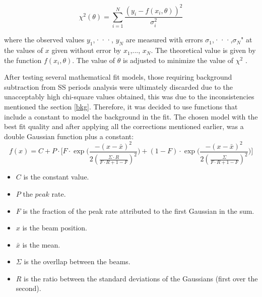 \begin{equation}
\chi^{2}(\theta)=\sum_{i=1}^{N} \frac{(y_{i}-f(x_{i},\theta))^{2}}{\sigma_{i}^{2}}
\label{x^2}
\end{equation}

where the observed values $y_{1}$,···, $y_{N}$ are measured with errors $\sigma_{1}$,···,$\sigma_{N}$" at the values of $x$ given without error by $x_{1}$,..., $x_{N}$. The theoretical  value is given by the function $f(x_{i},\theta)$. The value of $\theta$ is adjusted to minimize the value of $\chi^2$ \cite{Statistical_Data_Analysis}.

After testing several mathematical fit models, those requiring background subtraction from SS periods analysis were ultimately discarded due to the unacceptably high chi-square values obtained, this was due to the inconsistencies mentioned the section \ref{bkg}. Therefore, it was decided to use functions that include a constant to model the background in the fit. The chosen model with the best fit quality and after applying all the corrections mentioned earlier, was a double Gaussian function plus a constant:
\begin{equation}
f(x)= C+P \cdot \Biggl[ F \cdot \exp \Biggl( \frac{-(x-\bar{x})^{2}}{2(\frac{\Sigma\cdot R}{F \cdot R+1-F} )^{2} } \Biggr) + (1-F) \cdot \exp \Biggl( \frac{-(x-\bar{x})^{2}}{2 (\frac{\Sigma}{F \cdot R+1-F} )^{2} } \Biggr) \Biggr] 
\end{equation}
\begin{itemize}
\item $C$ is the constant value.
\item $P$ the $peak$ rate.
\item $F$ is the fraction of the peak rate attributed to the first Gaussian in the sum.
\item $x$ is the beam position.
\item $\bar{x}$ is the mean.
\item $\Sigma$ is the overllap between the beams.
\item $R$ is the ratio between the standard deviations of the  Gaussians (first over the second).
\end{itemize}

